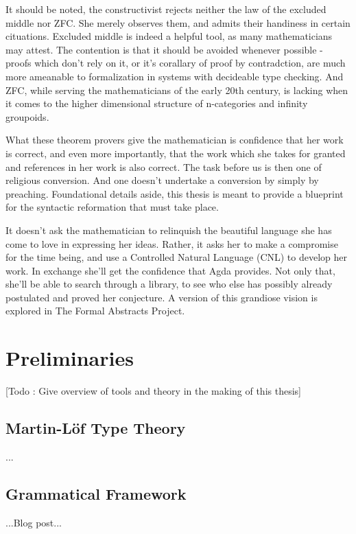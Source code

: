\documentclass[11pt, a4paper]{article}
\begin{document}
It should be noted, the constructivist rejects neither the law of the excluded
middle nor ZFC. She merely observes them, and admits their handiness in certain
cituations. Excluded middle is indeed a helpful tool, as many mathematicians
may attest. The contention is that it should be avoided whenever possible -
proofs which don't rely on it, or it's corallary of proof by contradction, are
much more ameanable to formalization in systems with decideable type checking.
And ZFC, while serving the mathematicians of the early 20th century, is 
lacking when it comes to the higher dimensional structure of n-categories and
infinity groupoids.

What these theorem provers give the mathematician is confidence that her work
is correct, and even more importantly, that the work which she takes for
granted and references in her work is also correct. The task before us is then
one of religious conversion. And one doesn't undertake a conversion by simply
by preaching. Foundational details aside, this thesis is meant to provide a
blueprint for the syntactic reformation that must take place.  

It doesn't ask the mathematician to relinquish the beautiful language she has
come to love in expressing her ideas.  Rather, it asks her to make a compromise
for the time being, and use a Controlled Natural Language (CNL) to develop her
work. In exchange she'll get the confidence that Agda provides. Not only that,
she'll be able to search through a library, to see who else has possibly
already postulated and proved her conjecture. A version of this grandiose vision is 
explored in The Formal Abstracts Project.

\section{Preliminaries}

[Todo : Give overview of tools and theory in the making of this thesis]

\subsection{Martin-Löf Type Theory}

...

\subsection{Grammatical Framework}

...Blog post...
\end{document}
